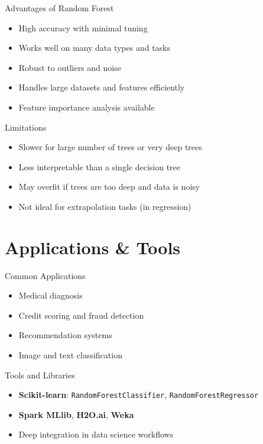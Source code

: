 \documentclass{beamer}
\begin{document}
\begin{frame}{Advantages of Random Forest}
\begin{itemize}
    \item High accuracy with minimal tuning
    \item Works well on many data types and tasks
    \item Robust to outliers and noise
    \item Handles large datasets and features efficiently
    \item Feature importance analysis available
\end{itemize}
\end{frame}

\begin{frame}{Limitations}
\begin{itemize}
    \item Slower for large number of trees or very deep trees
    \item Less interpretable than a single decision tree
    \item May overfit if trees are too deep and data is noisy
    \item Not ideal for extrapolation tasks (in regression)
\end{itemize}
\end{frame}

\section{Applications \& Tools}

\begin{frame}{Common Applications}
\begin{itemize}
    \item Medical diagnosis
    \item Credit scoring and fraud detection
    \item Recommendation systems
    \item Image and text classification
\end{itemize}
\end{frame}

\begin{frame}{Tools and Libraries}
\begin{itemize}
    \item \textbf{Scikit-learn}: \texttt{RandomForestClassifier}, \texttt{RandomForestRegressor}
    \item \textbf{Spark MLlib}, \textbf{H2O.ai}, \textbf{Weka}
    \item Deep integration in data science workflows
\end{itemize}
\end{frame}
\end{document}
